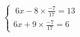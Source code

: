 \documentclass[preview]{standalone}
\begin{document}
\begin{align*}
\left\{ \begin{array}{cl} \ 6x - 8\times\frac{-7}{17} = 13 \\[1pt] 6x + 9\times\frac{-7}{17} = 6 \end{array} \right.
\end{align*}
\end{document}
